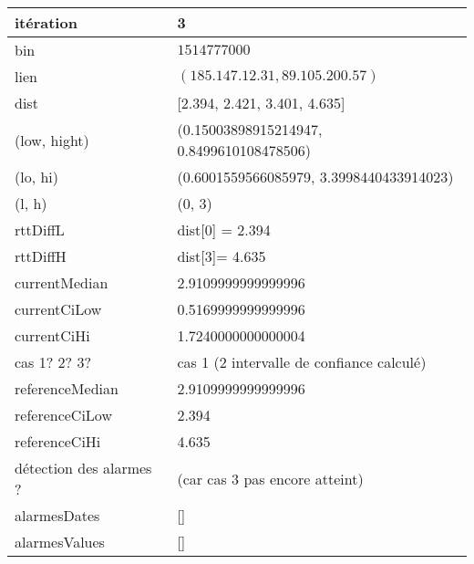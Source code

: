 	\begin{table}[H]
	\centering
	
	\begin{tabularx}{\linewidth}{|l|X| }
		\hline
		itération & 3	\\ \hline
		bin & $1514777000$ \\ \hline
		lien & $(185.147.12.31, 89.105.200.57)$  \\ \hline
		dist& [2.394, 2.421, 3.401, 4.635]	\\ \hline
		(low, hight)& (0.15003898915214947, 0.8499610108478506) 	\\ \hline
		(lo, hi)&(0.6001559566085979, 3.3998440433914023)  \\ \hline
		(l, h) & (0, 3) 	\\ \hline
		rttDiffL& dist[0] = 2.394	\\ \hline
		rttDiffH& dist[3]= 4.635	\\ \hline
		currentMedian& 2.9109999999999996	\\ \hline
		currentCiLow& 0.5169999999999996 	\\ \hline
		currentCiHi& 1.7240000000000004	\\ \hline
		cas 1? 2? 3?& cas 1 (2 intervalle de confiance calculé)  \\ \hline
		referenceMedian& 2.9109999999999996	\\ \hline
		referenceCiLow& 2.394	\\ \hline
		referenceCiHi& 4.635	\\ \hline
		détection des alarmes ?& (car cas 3 pas  encore atteint)	\\ \hline
		alarmesDates& []	\\ \hline
		alarmesValues& []	\\ \hline
		
		
	\end{tabularx}
\end{table}



